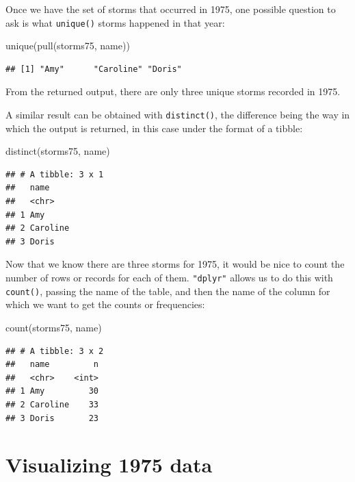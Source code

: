 \documentclass[
]{book}
\newenvironment{Shaded}{\begin{snugshade}}{\end{snugshade}}
\newcommand{\FunctionTok}[1]{\textcolor[rgb]{0.00,0.00,0.00}{#1}}
\newcommand{\NormalTok}[1]{#1}
\begin{document}
Once we have the set of storms that occurred in 1975, one possible question
to ask is what \texttt{unique()} storms happened in that year:

\begin{Shaded}
\begin{Highlighting}[]
\FunctionTok{unique}\NormalTok{(}\FunctionTok{pull}\NormalTok{(storms75, name))}
\end{Highlighting}
\end{Shaded}

\begin{verbatim}
## [1] "Amy"      "Caroline" "Doris"
\end{verbatim}

From the returned output, there are only three unique storms recorded in 1975.

A similar result can be obtained with \texttt{distinct()}, the difference being the
way in which the output is returned, in this case under the format of a tibble:

\begin{Shaded}
\begin{Highlighting}[]
\FunctionTok{distinct}\NormalTok{(storms75, name)}
\end{Highlighting}
\end{Shaded}

\begin{verbatim}
## # A tibble: 3 x 1
##   name    
##   <chr>   
## 1 Amy     
## 2 Caroline
## 3 Doris
\end{verbatim}

Now that we know there are three storms for 1975, it would be nice to count
the number of rows or records for each of them. \texttt{"dplyr"} allows us to do this
with \texttt{count()}, passing the name of the table, and then the name of the column
for which we want to get the counts or frequencies:

\begin{Shaded}
\begin{Highlighting}[]
\FunctionTok{count}\NormalTok{(storms75, name)}
\end{Highlighting}
\end{Shaded}

\begin{verbatim}
## # A tibble: 3 x 2
##   name         n
##   <chr>    <int>
## 1 Amy         30
## 2 Caroline    33
## 3 Doris       23
\end{verbatim}

\hypertarget{visualizing-1975-data}{%
\section{Visualizing 1975 data}\label{visualizing-1975-data}}
\end{document}

